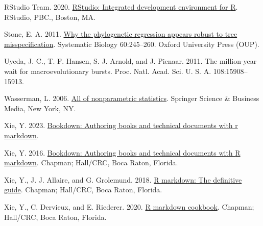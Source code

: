 \documentclass[fleqn,10pt,lineno]{wlpeerj} %
\newlength{\cslhangindent}
\newenvironment{CSLReferences}[2] %
 {\begin{list}{}{%
  \setlength{\itemindent}{0pt}
  \setlength{\leftmargin}{0pt}
  \setlength{\parsep}{0pt}
  \ifodd #1
   \setlength{\leftmargin}{\cslhangindent}
   \setlength{\itemindent}{-1\cslhangindent}
  \fi
  \setlength{\itemsep}{#2\baselineskip}}}
 {\end{list}}
\begin{document}
\begin{CSLReferences}{1}{0}
RStudio Team. 2020. \href{http://www.rstudio.com/}{R{S}tudio: Integrated development environment for {R}}. RStudio, PBC., Boston, MA.

Stone, E. A. 2011. \href{https://doi.org/10.1093/sysbio/syq098}{Why the phylogenetic regression appears robust to tree misspecification}. Systematic Biology 60:245--260. Oxford University Press (OUP).

Uyeda, J. C., T. F. Hansen, S. J. Arnold, and J. Pienaar. 2011. The million-year wait for macroevolutionary bursts. Proc. Natl. Acad. Sci. U. S. A. 108:15908--15913.

Wasserman, L. 2006. \href{https://doi.org/10.1007/0-387-30623-4}{All of nonparametric statistics}. Springer Science \& Business Media, New York, NY.

Xie, Y. 2023. \href{https://github.com/rstudio/bookdown}{Bookdown: Authoring books and technical documents with r markdown}.

Xie, Y. 2016. \href{https://bookdown.org/yihui/bookdown}{Bookdown: Authoring books and technical documents with {R} markdown}. Chapman; Hall/CRC, Boca Raton, Florida.

Xie, Y., J. J. Allaire, and G. Grolemund. 2018. \href{https://bookdown.org/yihui/rmarkdown}{R markdown: The definitive guide}. Chapman; Hall/CRC, Boca Raton, Florida.

Xie, Y., C. Dervieux, and E. Riederer. 2020. \href{https://bookdown.org/yihui/rmarkdown-cookbook}{R markdown cookbook}. Chapman; Hall/CRC, Boca Raton, Florida.

\end{CSLReferences}
\end{document}
